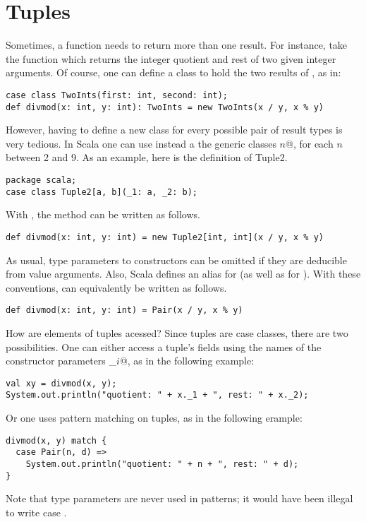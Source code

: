 \section{Tuples}

Sometimes, a function needs to return more than one result. For
instance, take the function  which returns the integer quotient
and rest of two given integer arguments.  Of course, one can define a
class to hold the two results of , as in:
\begin{lstlisting}
case class TwoInts(first: int, second: int);
def divmod(x: int, y: int): TwoInts = new TwoInts(x / y, x % y)
\end{lstlisting}
However, having to define a new class for every possible pair of
result types is very tedious. In Scala one can use instead a
the generic classes \lstinline@Tuple$n$@, for each $n$ between
2 and 9.  As an example, here is the definition of Tuple2.
\begin{lstlisting}
package scala;
case class Tuple2[a, b](_1: a, _2: b);
\end{lstlisting}
With , the  method can be written as follows.
\begin{lstlisting}
def divmod(x: int, y: int) = new Tuple2[int, int](x / y, x % y)
\end{lstlisting}
As usual, type parameters to constructors can be omitted if they are
deducible from value arguments. Also, Scala defines an alias
 for  (as well as  for ).
With these conventions,  can equivalently be written as
follows.
\begin{lstlisting}
def divmod(x: int, y: int) = Pair(x / y, x % y)
\end{lstlisting}
How are elements of tuples acessed? Since tuples are case classes,
there are two possibilities. One can either access a tuple's fields
using the names of the constructor parameters \lstinline@_$i$@, as in the following example:
\begin{lstlisting}
val xy = divmod(x, y);
System.out.println("quotient: " + x._1 + ", rest: " + x._2);
\end{lstlisting}
Or one uses pattern matching on tuples, as in the following erample:
\begin{lstlisting}
divmod(x, y) match {
  case Pair(n, d) => 
    System.out.println("quotient: " + n + ", rest: " + d);
}
\end{lstlisting}
Note that type parameters are never used in patterns; it would have
been illegal to write case .

